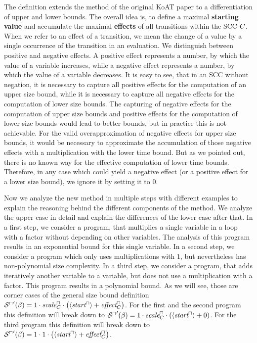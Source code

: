 The definition extends the method of the original KoAT paper \cite{koat} to a differentiation of upper and lower bounds.
The overall idea is, to define a maximal \textbf{starting value} and accumulate the maximal \textbf{effects} of all transitions within the SCC $C$.
When we refer to an effect of a transition, we mean the change of a value by a single occurrence of the transition in an evaluation.
We distinguish between positive and negative effects.
A positive effect represents a number, by which the value of a variable increases, while a negative effect represents a number, by which the value of a variable decreases.
It is easy to see, that in an SCC without negation, it is necessary to capture all positive effects for the computation of an upper size bound, while it is necessary to capture all negative effects for the computation of lower size bounds.
The capturing of negative effects for the computation of upper size bounds and positive effects for the computation of lower size bounds would lead to better bounds, but in practice this is not achievable.
For the valid overapproximation of negative effects for upper size bounds, it would be necessary to approximate the accumulation of those negative effects with a multiplication with the lower time bound.
But as we pointed out, there is no known way for the effective computation of lower time bounds.
Therefore, in any case which could yield a negative effect (or a positive effect for a lower size bound), we ignore it by setting it to $0$.

Now we analyze the new method in multiple steps with different examples to explain the reasoning behind the different components of the method.
We analyze the upper case in detail and explain the differences of the lower case after that.
In a first step, we consider a program, that multiplies a single variable in a loop with a factor without depending on other variables.
The analysis of this program results in an exponential bound for this single variable.
In a second step, we consider a program which only uses multiplications with $1$, but nevertheless has non-polynomial size complexity.
In a third step, we consider a program, that adds iteratively another variable to a variable, but does not use a multiplication with a factor.
This program results in a polynomial bound.
As we will see, those are corner cases of the general size bound definition ${\mathcal{S}^\sqcap}'(\beta) = 1 \cdot \emph{scale}^\sqcap_C \cdot \left( \langle\emph{start}^\sqcap\rangle + \emph{effect}^\sqcap_C \right)$.
For the first and the second program this definition will break down to ${\mathcal{S}^\sqcap}'(\beta) = 1 \cdot \emph{scale}^\sqcap_C \cdot \left( \langle\emph{start}^\sqcap\rangle + 0 \right)$.
For the third program this definition will break down to ${\mathcal{S}^\sqcap}'(\beta) = 1 \cdot 1 \cdot \left( \langle\emph{start}^\sqcap\rangle + \emph{effect}^\sqcap_C \right)$.

